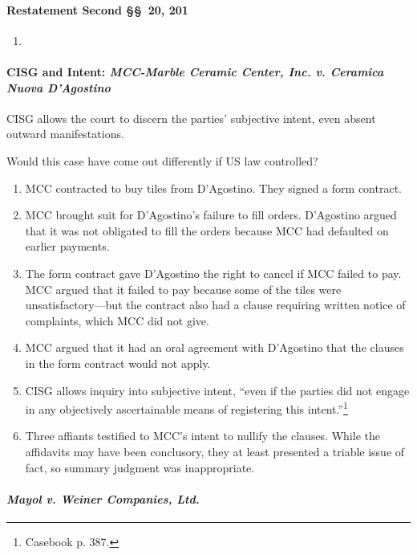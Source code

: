 \paragraph{Restatement Second \S\S\ 20, 201}

\begin{enumerate}
    \item %
\end{enumerate}

\paragraph{CISG and Intent: \emph{MCC-Marble Ceramic Center, Inc. v. 
Ceramica Nuova D'Agostino}}

CISG allows the court to discern the parties' subjective intent, even absent 
outward manifestations.

Would this case have come out differently if US law controlled?

\begin{enumerate}
    \item MCC contracted to buy tiles from D'Agostino. They signed a form 
    contract.
    \item MCC brought suit for D'Agostino's failure to fill orders. D'Agostino 
    argued that it was not obligated to fill the orders because MCC had 
    defaulted on earlier payments.
    \item The form contract gave D'Agostino the right to cancel if MCC failed 
    to pay. MCC argued that it failed to pay because some of the tiles were 
    unsatisfactory---but the contract also had a clause requiring written 
    notice of complaints, which MCC did not give.
    \item MCC argued that it had an oral agreement with D'Agostino that the 
    clauses in the form contract would not apply.
    \item CISG allows inquiry into subjective intent, ``even if the parties 
    did not engage in any objectively ascertainable means of registering this 
    intent.''\footnote{Casebook p. 387.}
    \item Three affiants testified to MCC's intent to nullify the clauses. 
    While the affidavits may have been conclusory, they at least presented a 
    triable issue of fact, so summary judgment was inappropriate.
\end{enumerate}

\paragraph{\emph{Mayol v. Weiner Companies, Ltd.}}

